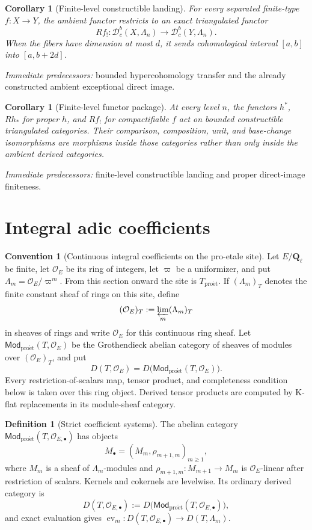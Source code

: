 \documentclass[10pt]{article}
\newtheorem{corollary}[theorem]{Corollary}
\theoremstyle{definition}
\newtheorem{definition}[theorem]{Definition}
\newtheorem{convention}[theorem]{Convention}
\newcommand{\Ql}{\mathbf Q_\ell}
\newcommand{\Dbc}{\mathcal D^b_c}
\newcommand{\Mod}{\mathsf{Mod}}
\newcommand{\pred}[1]{\par\smallskip\begingroup\footnotesize\raggedright
\emph{Immediate predecessors:} #1.\par\endgroup}
\begin{document}
\begin{corollary}[Finite-level constructible landing]
For every separated finite-type \(f:X\to Y\), the ambient functor restricts
to an exact triangulated functor
\[
 Rf_!: \Dbc(X,\Lambda_n)\longrightarrow\Dbc(Y,\Lambda_n).
\]
When the fibers have dimension at most \(d\), it sends cohomological
interval \([a,b]\) into \([a,b+2d]\).
\end{corollary}
\pred{bounded hypercohomology transfer and the already constructed ambient exceptional direct image}

\begin{corollary}[Finite-level functor package]
At every level \(n\), the functors \(h^*\), \(Rh_*\) for proper \(h\), and
\(Rf_!\) for compactifiable \(f\) act on bounded constructible
triangulated categories.  Their comparison, composition, unit, and
base-change isomorphisms are morphisms inside those categories rather than
only inside the ambient derived categories.
\end{corollary}
\pred{finite-level constructible landing and proper direct-image finiteness}

\section{Integral adic coefficients}

\begin{convention}[Continuous integral coefficients on the pro-etale site]
Let \(E/\Ql\) be finite, let \(\mathcal O_E\) be its ring of integers, let
\(\varpi\) be a uniformizer, and put
\(\Lambda_m=\mathcal O_E/\varpi^m\).  From this section onward the site is
\(T_{\mathrm{pro\acute et}}\).  If \((\Lambda_m)_T\) denotes the finite
constant sheaf of rings on this site, define
\[
 (\mathcal O_E)_T:=\varprojlim_m(\Lambda_m)_T
\]
in sheaves of rings and write \(\mathcal O_E\) for this continuous ring
sheaf.  Let
\(\Mod_{\mathrm{pro\acute et}}(T,\mathcal O_E)\) be the Grothendieck abelian category of
sheaves of modules over \((\mathcal O_E)_T\), and put
\[
 D(T,\mathcal O_E)=D\bigl(\Mod_{\mathrm{pro\acute et}}(T,\mathcal O_E)\bigr).
\]
Every restriction-of-scalars map, tensor product, and completeness
condition below is taken over this ring object.  Derived tensor products
are computed by K-flat replacements in its module-sheaf category.
\end{convention}

\begin{definition}[Strict coefficient systems]
The abelian category
\(\Mod_{\mathrm{pro\acute et}}(T,\mathcal O_{E,\bullet})\) has objects
\[
 M_\bullet=(M_m,\rho_{m+1,m})_{m\ge1},
\]
where \(M_m\) is a sheaf of \(\Lambda_m\)-modules and
\(\rho_{m+1,m}:M_{m+1}\to M_m\) is \(\mathcal O_E\)-linear after restriction
of scalars.  Kernels and cokernels are levelwise.  Its ordinary derived
category is
\[
 D(T,\mathcal O_{E,\bullet})
 :=D\bigl(\Mod_{\mathrm{pro\acute et}}(T,\mathcal O_{E,\bullet})\bigr),
\]
and exact evaluation gives
\(\operatorname{ev}_m:D(T,\mathcal O_{E,\bullet})\to D(T,\Lambda_m)\).
\end{definition}
\end{document}
